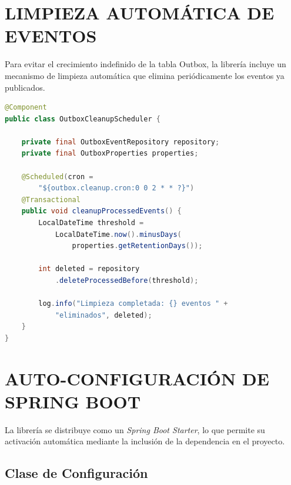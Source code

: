 \section{LIMPIEZA AUTOMÁTICA DE EVENTOS}

Para evitar el crecimiento indefinido de la tabla Outbox, la librería incluye un mecanismo de limpieza automática que elimina periódicamente los eventos ya publicados.

\begin{lstlisting}[language=Java, caption={Componente de limpieza automática de eventos procesados.}]
@Component
public class OutboxCleanupScheduler {

    private final OutboxEventRepository repository;
    private final OutboxProperties properties;

    @Scheduled(cron =
        "${outbox.cleanup.cron:0 0 2 * * ?}")
    @Transactional
    public void cleanupProcessedEvents() {
        LocalDateTime threshold =
            LocalDateTime.now().minusDays(
                properties.getRetentionDays());

        int deleted = repository
            .deleteProcessedBefore(threshold);

        log.info("Limpieza completada: {} eventos " +
            "eliminados", deleted);
    }
}
\end{lstlisting}

\section{AUTO-CONFIGURACIÓN DE SPRING BOOT}

La librería se distribuye como un \textit{Spring Boot Starter}, lo que permite su activación automática mediante la inclusión de la dependencia en el proyecto.

\subsection{Clase de Configuración}

